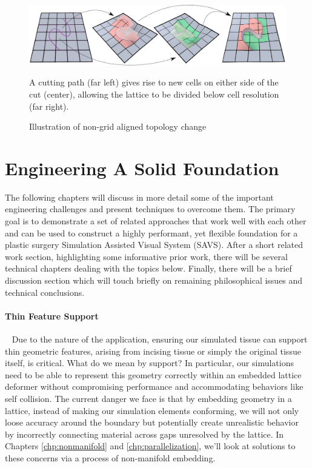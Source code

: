   
  \begin{figure}[b]
    \centering
    \includegraphics[width=.9\textwidth]{chapter_gridiron/images/New_HybridLattice2.pdf}
    \vspace*{-.1in}
    \caption{Illustration of non-grid aligned topology change}{ A cutting path
    (far left) gives rise to new cells on either side of the cut
    (center), allowing the lattice to be divided below cell resolution
  (far right).}
    \vspace*{-.15in}
    \label{Fig:MaterialContinuityPreview}
  \end{figure}
  
  \section{Engineering A Solid Foundation}

  The following chapters will discuss in more detail some of the
  important engineering challenges and present techniques to overcome
  them. The primary goal is to demonstrate a set of related approaches
  that work well with each other and can be used to construct a highly
  performant, yet flexible foundation for a plastic surgery
  Simulation Assisted Visual System (SAVS). After a short related work section, highlighting some
  informative prior work, there will be several technical chapters
  dealing with the topics below. Finally, there will be a brief
  discussion section which will touch briefly on remaining
  philosophical issues and technical conclusions.

    \paragraph{Thin Feature Support}~ Due to the nature of the
      application, ensuring our simulated tissue can support thin
      geometric features, arising from incising tissue or simply the
      original tissue itself, is critical. What do we mean by support?
      In particular, our simulations need to be able to represent this
      geometry correctly within an embedded lattice deformer without
      compromising performance and accommodating behaviors like self
      collision. The current danger we face is that by embedding
      geometry in a lattice, instead of making our simulation elements
      conforming, we will not only loose accuracy around the boundary
      but potentially create unrealistic behavior by incorrectly connecting
      material across gaps unresolved by the lattice. In Chapters
      \ref{chp:nonmanifold} and \ref{chp:parallelization}, we'll look at
      solutions to these concerns via a process of non-manifold embedding.

